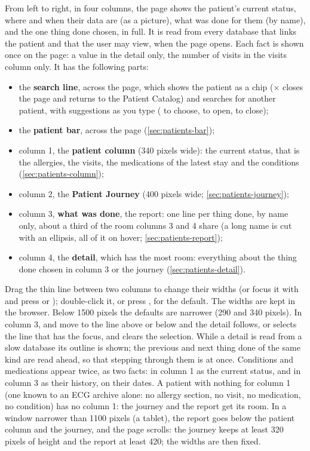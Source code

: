 From left to right, in four columns, the page shows the patient's current status, where and when
their data are (as a picture), what was done for them (by name), and the one thing done chosen,
in full. It is read from every database that links the patient and that the user may view, when
the page opens. Each fact is shown once on the page: a value in the detail only, the number of
visits in the visits column only. It has the following parts:
\begin{itemize}
\item the \textbf{search line}, across the page, which shows the patient as a chip ($\times$
  closes the page and returns to the Patient Catalog) and searches for another patient, with
  suggestions as you type (\key{$\uparrow$} \key{$\downarrow$} to choose,  to open,
   to close);
\item the \textbf{patient bar}, across the page (\cref{sec:patients-bar});
\item column 1, the \textbf{patient column} (340 pixels wide): the current status, that is
  the allergies, the visits, the medications of the latest stay and the conditions
  (\cref{sec:patients-column});
\item column 2, the \textbf{Patient Journey} (400 pixels wide; \cref{sec:patients-journey});
\item column 3, \textbf{what was done}, the report: one line per thing done, by name only, about
  a third of the room columns 3 and 4 share (a long name is cut with an ellipsis, all of it on
  hover; \cref{sec:patients-report});
\item column 4, the \textbf{detail}, which has the most room: everything about the thing done
  chosen in column 3 or the journey (\cref{sec:patients-detail}).
\end{itemize}
Drag the thin line between two columns to change their widths (or focus it with  and
press \key{$\leftarrow$} or \key{$\rightarrow$}); double-click it, or press , for the
default. The widths are kept in the browser. Below 1500 pixels the defaults are narrower (290
and 340 pixels). In column 3, \key{$\uparrow$} and \key{$\downarrow$} move to the line above or
below and the detail follows,  or  selects the line that has the focus,
and  clears the selection. While a detail is read from a slow database its outline is
shown; the previous and next thing done of the same kind are read ahead, so that stepping
through them is at once.
Conditions and medications appear twice, as two facts: in column 1 as the current status, and
in column 3 as their history, on their dates. A patient with nothing for column 1 (one known to
an ECG archive alone: no allergy section, no visit, no medication, no condition) has no column
1: the journey and the report get its room. In a window narrower than 1100 pixels (a tablet),
the report goes below the patient column and the journey, and the page scrolls: the journey
keeps at least 320 pixels of height and the report at least 420; the widths are then fixed.

